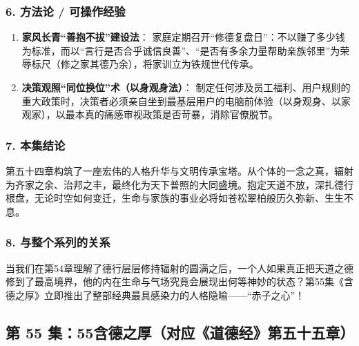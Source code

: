 \subsubsection{6. 方法论 / 可操作经验}
\begin{enumerate}
    \item \textbf{家风长青“善抱不拔”建设法}：
    家庭定期召开“修德复盘日”：不以赚了多少钱为标准，而以“言行是否合乎诚信良善”、“是否有多余力量帮助亲族邻里”为荣辱标尺（修之家其德乃余），将家训立为铁规世代传承。
    \item \textbf{决策观照“同位换位”术（以身观身法）}：
    制定任何涉及员工福利、用户规则的重大政策时，决策者必须亲自坐到最基层用户的电脑前体验（以身观身、以家观家），以最本真的痛感审视政策是否苛暴，消除官僚脱节。
\end{enumerate}

\subsubsection{7. 本集结论}
第五十四章构筑了一座宏伟的人格升华与文明传承宝塔。从个体的一念之真，辐射为齐家之余、治邦之丰，最终化为天下普照的大同盛境。抱定天道不放，深扎德行根盘，无论时空如何变迁，生命与家族的事业必将如苍松翠柏般历久弥新、生生不息。

\subsubsection{8. 与整个系列的关系}
当我们在第54章理解了德行层层修持辐射的圆满之后，一个人如果真正把天道之德修到了最高境界，他的内在生命与气场究竟会展现出何等神妙的状态？第55集《含德之厚》立即推出了整部经典最具感染力的人格隐喻——“赤子之心”！

\clearpage

\subsection{第 55 集：55含德之厚（对应《道德经》第五十五章）}
\label{sec:ep55}

